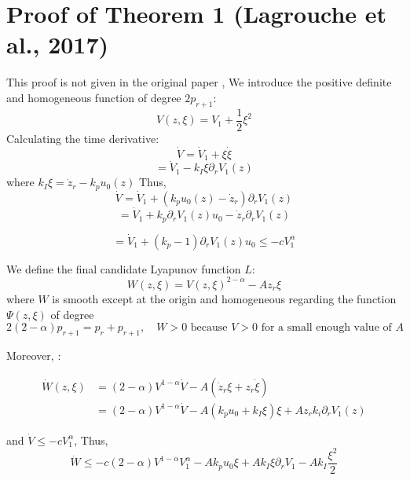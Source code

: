 \chapter{Proof of Theorem 1 (Lagrouche et al., 2017)}
\label{app:proof_theorem1}
This proof is not given in the original paper \cite{Laghrouche2017},
We introduce the positive definite and homogeneous function of degree \(2p_{r+1}\):
\begin{equation}
V(z, \xi) = V_1 + \frac{1}{2} \xi^2
\end{equation}
Calculating the time derivative:
\begin{equation}
\dot{V} = \dot{V}_1 + \xi \dot{\xi}
\end{equation}
\begin{equation}
= \dot{V}_1 - k_I \xi \partial_r V_1(z)
\end{equation}
where \(k_I \xi = \dot{z}_r - k_p u_0(z)\)
Thus,
\begin{equation}
\dot{V} = \dot{V}_1 + (k_p u_0(z) - \dot{z}_r) \partial_r V_1(z)
\end{equation}
\begin{equation}
= \dot{V}_1 + k_p \partial_r V_1(z) u_0 - \dot{z}_r \partial_r V_1(z)
\end{equation}

\begin{equation}
= \dot{V}_1 + (k_p - 1) \partial_r V_1(z) u_0 \leq -c V_1^\alpha
\end{equation}


We define the final candidate Lyapunov function \(L\):
\begin{equation}
W(z, \xi) = V(z, \xi)^{2-\alpha} - A z_r \xi
\end{equation}
where \(W\) is smooth except at the origin and homogeneous regarding the function \(\Psi(z, \xi)\) of degree
\begin{equation}
2(2-\alpha) p_{r+1} = p_r + p_{r+1}, \quad W > 0 \text{ because } V > 0 \text{ for a small enough value of } A
\end{equation}


Moreover, : 

\begin{align*}
    \dot{W}(z, \xi) &= (2-\alpha) V^{1-\alpha} \dot{V} - A (\dot{z}_r \xi + z_r \dot{\xi}) \\
    &= (2-\alpha) V^{1-\alpha} \dot{V} - A (k_p u_0 + k_I \xi) \xi + A z_r k_i \partial_r V_1(z)
\end{align*}


and \(\dot{V} \leq -c V_1^\alpha\), Thus,
\begin{equation}
\dot{W} \leq -c (2-\alpha) V^{1-\alpha} V_1^\alpha - A k_p u_0 \xi + A k_I \xi \partial_r V_1 - A k_I \frac{\xi^2}{2}
\end{equation}


